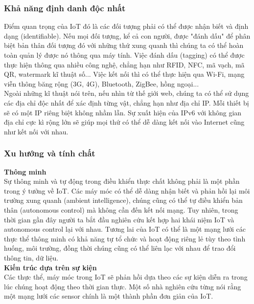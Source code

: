 \documentclass[a4paper,12pt,oneside]{article}
\begin{document}
\subsubsection{Khả năng định danh độc nhất}

\noindent Điểm quan trọng của IoT đó là các đối tượng phải có thể được nhận biết và định dạng (identifiable). Nếu mọi đối tượng, kể cả con người, được "đánh dấu" để phân biệt bản thân đối tượng đó với những thứ xung quanh thì chúng ta có thể hoàn toàn quản lý được nó thông qua máy tính. Việc đánh dấu (tagging) có thể được thực hiện thông qua nhiều công nghệ, chẳng hạn như RFID, NFC, mã vạch, mã QR, watermark kĩ thuật số... Việc kết nối thì có thể thực hiện qua Wi-Fi, mạng viễn thông băng rộng (3G, 4G), Bluetooth, ZigBee, hồng ngoại...\\

\noindent Ngoài những kĩ thuật nói trên, nếu nhìn từ thế giới web, chúng ta có thể sử dụng các địa chỉ độc nhất để xác định từng vật, chẳng hạn như địa chỉ IP. Mỗi thiết bị sẽ có một IP riêng biệt không nhầm lẫn. Sự xuất hiện của IPv6 với không gian địa chỉ cực kì rộng lớn sẽ giúp mọi thứ có thể dễ dàng kết nối vào Internet cũng như kết nối với nhau.\\

\subsubsection{Xu hướng và tính chất}

\noindent \textbf{Thông minh}\\
\noindent Sự thông minh và tự động trong điều khiển thực chất không phải là một phần trong ý tưởng về IoT. Các máy móc có thể dễ dàng nhận biết và phản hồi lại môi trường xung quanh (ambient intelligence), chúng cũng có thể tự điều khiển bản thân (autonomous control) mà không cần đến kết nối mạng. Tuy nhiên, trong thời gian gần đây người ta bắt đầu nghiên cứu kết hợp hai khái niệm IoT và autonomous control lại với nhau. Tương lai của IoT có thể là một mạng lưới các thực thể thông minh có khả năng tự tổ chức và hoạt động riêng lẻ tùy theo tình huống, môi trường, đồng thời chúng cũng có thể liên lạc với nhau để trao đổi thông tin, dữ liệu.\\

\noindent \textbf{Kiến trúc dựa trên sự kiện}\\
\noindent Các thực thể, máy móc trong IoT sẽ phản hồi dựa theo các sự kiện diễn ra trong lúc chúng hoạt động theo thời gian thực. Một số nhà nghiên cứu từng nói rằng một mạng lưới các sensor chính là một thành phần đơn giản của IoT.\\
\end{document}
